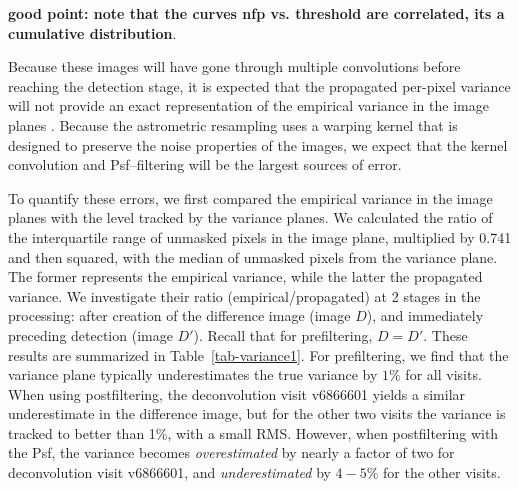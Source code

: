 \documentclass[prd, nofootinbib, floatfix, 11pt,tightenlines,times]{article}
\begin{document}
{\bf good point: note that the curves nfp vs. threshold are
  correlated, its a cumulative distribution}.

Because these images will have gone through multiple convolutions
before reaching the detection stage, it is expected that the
propagated per-pixel variance will not provide an exact representation
of the empirical variance in the image planes \citep{Price-Stacking}.
Because the astrometric resampling uses a warping kernel that is
designed to preserve the noise properties of the images, we expect
that the kernel convolution and Psf--filtering will be the largest
sources of error.

To quantify these errors, we first compared the empirical variance in
the image planes with the level tracked by the variance planes.  We
calculated the ratio of the interquartile range of unmasked pixels in
the image plane, multiplied by 0.741 and then squared, with the median
of unmasked pixels from the variance plane.  The former represents the
empirical variance, while the latter the propagated variance.  We
investigate their ratio (empirical/propagated) at 2 stages in the
processing: after creation of the difference image (image $D$), and
immediately preceding detection (image $D'$).  Recall that for
prefiltering, $D = D'$.  These results are summarized in
Table~\ref{tab-variance1}.  For prefiltering, we find that the
variance plane typically underestimates the true variance by $1\%$ for
all visits.  When using postfiltering, the deconvolution visit
v6866601 yields a similar underestimate in the difference image, but
for the other two visits the variance is tracked to better than 1\%,
with a small RMS.  However, when postfiltering with the Psf, the
variance becomes {\it overestimated} by nearly a factor of two for
deconvolution visit v6866601, and {\it underestimated} by $4-5\%$ for
the other visits.
\end{document}
